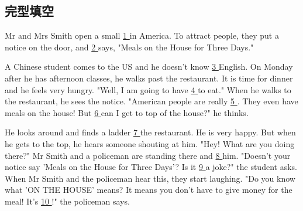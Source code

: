 \subsection{完型填空}
\item{
    Mr and Mrs Smith open a small \underline{ 1 } in America. To attract people, they put a notice on the door, and \underline{ 2 } says, "Meals on the House for Three Days."

    \hspace{2em} 
    A Chinese student comes to the US and he doesn't know \underline{ 3 } English. On Monday after he has afternoon classes, he walks past the restaurant. It is time for dinner and he feels very hungry. "Well, I am going to have \underline{ 4 } to eat." When he walks to the restaurant, he sees the notice. "American people are really \underline{ 5 }. They even have meals on the house! But \underline{ 6 } can I get to top of the house?" he thinks.

    \hspace{2em} 
    He looks around and finds a ladder \underline{ 7 } the restaurant. He is very happy. But when he gets to the top, he hears someone shouting at him. "Hey! What are you doing there?" Mr Smith and a policeman are standing there and \underline{ 8 } him. "Doesn't your notice say 'Meals on the House for Three Days'? Is it \underline{ 9 } a joke?" the student asks. When Mr Smith and the policeman hear this, they start laughing. "Do you know what 'ON THE HOUSE' means? It means you don't have to give money for the meal! It's \underline{ 10 }!" the policeman says.

}
